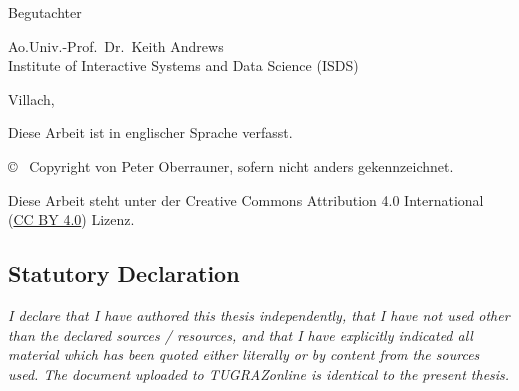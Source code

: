 \begin{otherlanguage}{austrian}
\begin{center}
        {\small\sffamily Begutachter}

        \vspace{5mm}

        {\normalsize\sffamily
            Ao.Univ.-Prof.\ Dr.\ Keith Andrews \\
            Institute of Interactive Systems and Data Science (ISDS)
        }


        \vspace{1cm}

        {\normalsize\sffamily Villach, \thisdate}


        \vspace{1cm}

        {\small Diese Arbeit ist in englischer Sprache verfasst.}



        \vfill

        {\footnotesize\sffamily \copyright ~ Copyright \thisyear{} von Peter Oberrauner, sofern
            nicht anders gekennzeichnet.}

        {\footnotesize\sffamily Diese Arbeit steht unter der Creative Commons
            Attribution 4.0 International
            (\href{https://creativecommons.org/licenses/by/4.0/}{CC BY 4.0})
            Lizenz.}

    \end{center}

\end{otherlanguage}







\cleardoublepage

\vspace*{2cm}







\subsection*{Statutory Declaration}
\noindent
\textit{
    I declare that I have authored this thesis independently, that I have
    not used other than the declared sources / resources, and that I have
    explicitly indicated all material which has been quoted either
    literally or by content from the sources used. The document uploaded
    to TUGRAZonline is identical to the present thesis.}

